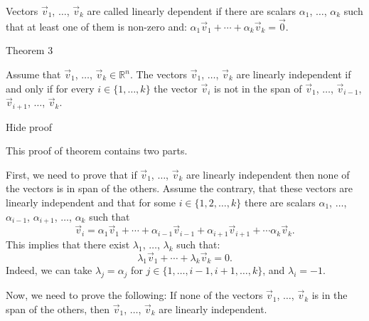 Vectors \( \overrightarrow v_1 \), \( \dots \), \( \overrightarrow v_k \) are called linearly dependent if there are scalars \( \alpha_1 \), \( \dots \), \( \alpha_k \) such that at least one of them is non-zero and: \( \alpha_1\overrightarrow v_1+\cdots+\alpha_k\overrightarrow v_k=\overrightarrow 0 \).

Theorem 3

Assume that \( \overrightarrow v_1 \), \( \dots \), \( \overrightarrow v_k\in\mathbb R^n \). The vectors \( \overrightarrow v_1 \), \( \dots \), \( \overrightarrow v_k \) are linearly independent if and only if for every \( i\in\{1,\dots, k\} \) the vector \( \overrightarrow v_i \) is not in the span of \( \overrightarrow v_1 \), \( \dots \), \( \overrightarrow v_{i-1} \), \( \overrightarrow v_{i+1} \), \( \dots \), \( \overrightarrow v_k \).

Hide proof

This proof of theorem contains two parts.

First, we need to prove that if \( \overrightarrow v_1 \), \( \dots \), \( \overrightarrow v_k \) are linearly independent then none of the vectors is in span of the others. Assume the contrary, that these vectors are linearly independent and that for some \( i\in\{1,2,\dots, k\} \) there are scalars \( \alpha_1 \), \( \dots \), \( \alpha_{i-1} \), \( \alpha_{i+1} \), \( \dots \), \( \alpha_k \) such that \[ \overrightarrow v_i=\alpha_1\overrightarrow v_1+\cdots+ \alpha_{i-1}\overrightarrow v_{i-1}+ \alpha_{i+1}\overrightarrow v_{i+1}+\cdots \alpha_{k}\overrightarrow v_{k}.\] This implies that there exist \( \lambda_1 \), \( \dots \), \( \lambda_k \) such that: \[ \lambda_1\overrightarrow v_1+\cdots+ \lambda_{k}\overrightarrow v_{k}=0.\] Indeed, we can take \( \lambda_j=\alpha_j \) for \( j\in \{1,\dots, i-1,i+1,\dots, k\} \), and \( \lambda_i=-1 \).

Now, we need to prove the following: If none of the vectors \( \overrightarrow v_1 \), \( \dots \), \( \overrightarrow v_k \) is in the span of the others, then \( \overrightarrow v_1 \), \( \dots \), \( \overrightarrow v_k \) are linearly independent.

